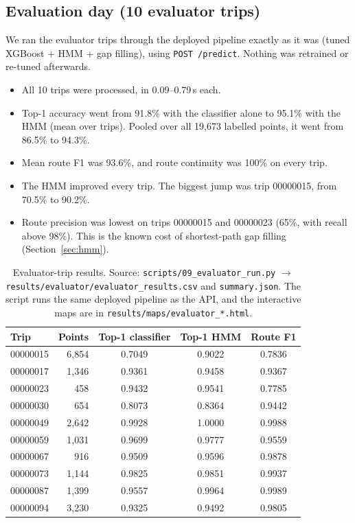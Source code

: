 \documentclass[11pt,a4paper]{article}
\newcommand{\code}[1]{\texttt{\small #1}}
\begin{document}
\subsection{Evaluation day (10 evaluator trips)}
\label{sec:evalday}

We ran the evaluator trips through the deployed pipeline exactly as it was (tuned XGBoost + HMM + gap
filling), using \code{POST /predict}. Nothing was retrained or re-tuned afterwards.
\begin{itemize}
  \item All 10 trips were processed, in 0.09--0.79\,s each.
  \item Top-1 accuracy went from 91.8\% with the classifier alone to 95.1\% with the HMM (mean over trips).
        Pooled over all 19,673 labelled points, it went from 86.5\% to 94.3\%.
  \item Mean route F1 was 93.6\%, and route continuity was 100\% on every trip.
  \item The HMM improved every trip. The biggest jump was trip 00000015, from 70.5\% to 90.2\%.
  \item Route precision was lowest on trips 00000015 and 00000023 (65\%, with recall above 98\%). This is
        the known cost of shortest-path gap filling (Section~\ref{sec:hmm}).
\end{itemize}

\begin{table}[H]
\centering
\small
\begin{tabular}{@{}lrccc@{}}
\toprule
\textbf{Trip} & \textbf{Points} & \textbf{Top-1 classifier} & \textbf{Top-1 HMM} & \textbf{Route F1} \\
\midrule
00000015 & 6,854 & 0.7049 & 0.9022 & 0.7836 \\
00000017 & 1,346 & 0.9361 & 0.9458 & 0.9367 \\
00000023 & 458 & 0.9432 & 0.9541 & 0.7785 \\
00000030 & 654 & 0.8073 & 0.8364 & 0.9442 \\
00000049 & 2,642 & 0.9928 & 1.0000 & 0.9988 \\
00000059 & 1,031 & 0.9699 & 0.9777 & 0.9559 \\
00000067 & 916 & 0.9509 & 0.9596 & 0.9878 \\
00000073 & 1,144 & 0.9825 & 0.9851 & 0.9937 \\
00000087 & 1,399 & 0.9557 & 0.9964 & 0.9989 \\
00000094 & 3,230 & 0.9325 & 0.9492 & 0.9805 \\
\bottomrule
\end{tabular}
\caption{Evaluator-trip results. Source: \code{scripts/09\_evaluator\_run.py} $\rightarrow$
\code{results/evaluator/evaluator\_results.csv} and \code{summary.json}. The script runs the same deployed
pipeline as the API, and the interactive maps are in \code{results/maps/evaluator\_*.html}.}
\end{table}
\end{document}
